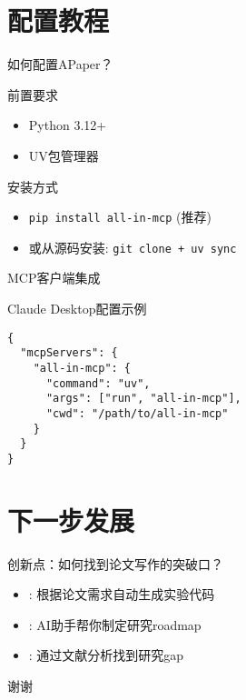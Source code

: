 \documentclass{beamer}
\begin{document}
\section{配置教程}
\begin{frame}{如何配置APaper？}
  \begin{block}{前置要求}
    \begin{itemize}
      \item Python 3.12+ 
      \item UV包管理器
    \end{itemize}
  \end{block}
  
  \begin{block}{安装方式}
    \begin{itemize}
      \item \texttt{pip install all-in-mcp} (推荐)
      \item 或从源码安装: \texttt{git clone + uv sync}
    \end{itemize}
  \end{block}
\end{frame}

\begin{frame}[fragile]{MCP客户端集成}
  \begin{block}{Claude Desktop配置示例}
    \begin{verbatim}
{
  "mcpServers": {
    "all-in-mcp": {
      "command": "uv",
      "args": ["run", "all-in-mcp"],
      "cwd": "/path/to/all-in-mcp"
    }
  }
}
    \end{verbatim}
  \end{block}
\end{frame}

\section{下一步发展}
\begin{frame}{创新点：如何找到论文写作的突破口？}
  \begin{itemize}
    \item {}: 根据论文需求自动生成实验代码
    \item {}: AI助手帮你制定研究roadmap
    \item {}: 通过文献分析找到研究gap
  \end{itemize}
\end{frame}

\begin{frame}
  \centering
  \LARGE 谢谢

\end{frame}
\end{document}
